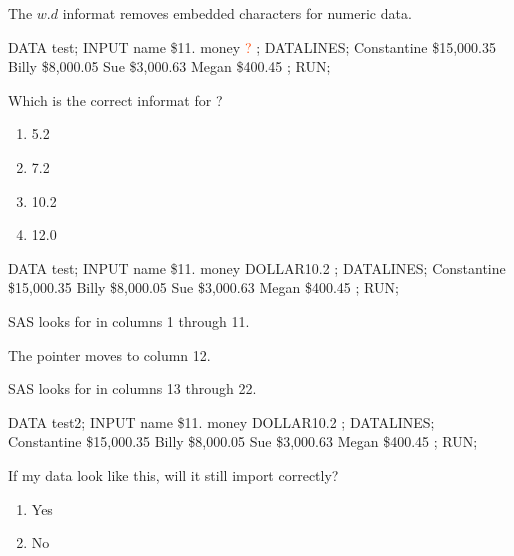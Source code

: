 \begin{frame}[fragile]
The $w.d$ informat removes embedded characters for numeric data.
\vskip10pt
\footnotesize
\begin{code}{.0}
DATA test;
INPUT name \$11. money \textcolor{OrangeRed}{?} ;
DATALINES;
Constantine \$15,000.35
Billy       \$8,000.05
Sue         \$3,000.63
Megan       \$400.45
;
RUN;
\end{code}
\emp
{}
\hspace{0.05in}
\emp
{}
\begin{clicker}{Which is the correct informat for ?}
\begin{enumerate}
    \item {}5.2
    \item {}7.2
    \item {}10.2
    \item {}12.0
\end{enumerate}
\end{clicker}
\emp
\end{frame}

\begin{frame}[fragile]
\footnotesize
\begin{code}{.0}
DATA test;
INPUT name \$11. money DOLLAR10.2 ;
DATALINES;
Constantine \$15,000.35
Billy       \$8,000.05
Sue         \$3,000.63
Megan       \$400.45
;
RUN;
\end{code}
\emp
{}
\hspace{0.05in}
\emp
{}
\bi
\item SAS looks for  in columns 1 through 11.
\item The pointer moves to column 12.
\item SAS looks for  in columns 13 through 22.
\ei
\emp
\end{frame}

\begin{frame}[fragile]
\footnotesize
\begin{code}{.0}
DATA test2;
INPUT name \$11. money DOLLAR10.2 ;
DATALINES;
Constantine \$15,000.35
Billy \$8,000.05
Sue \$3,000.63
Megan \$400.45
;
RUN;
\end{code}
\emp
{}
\hspace{0.05in}
\emp
{}
\begin{clicker}{If my data look like this, will it still import correctly?}
\begin{enumerate}
\item Yes
\item No
\end{enumerate}
\end{clicker}
\emp
\end{frame}

